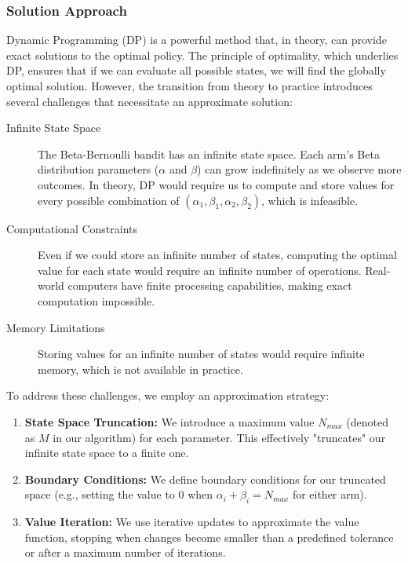 \documentclass[11pt]{article}
\begin{document}
\subsubsection*{Solution Approach}

Dynamic Programming (DP) is a powerful method that, in theory, can provide exact solutions to the optimal policy. The principle of optimality, which underlies DP, ensures that if we can evaluate all possible states, we will find the globally optimal solution. However, the transition from theory to practice introduces several challenges that necessitate an approximate solution:

\begin{description}
    \item[Infinite State Space] The Beta-Bernoulli bandit has an infinite state space. Each arm's Beta distribution parameters ($\alpha$ and $\beta$) can grow indefinitely as we observe more outcomes. In theory, DP would require us to compute and store values for every possible combination of $(\alpha_1, \beta_1, \alpha_2, \beta_2)$, which is infeasible.

    \item[Computational Constraints] Even if we could store an infinite number of states, computing the optimal value for each state would require an infinite number of operations. Real-world computers have finite processing capabilities, making exact computation impossible.

    \item[Memory Limitations] Storing values for an infinite number of states would require infinite memory, which is not available in practice.
\end{description}

To address these challenges, we employ an approximation strategy:

\begin{enumerate}
    \item \textbf{State Space Truncation:} We introduce a maximum value $N_{max}$ (denoted as $M$ in our algorithm) for each parameter. This effectively "truncates" our infinite state space to a finite one.

    \item \textbf{Boundary Conditions:} We define boundary conditions for our truncated space (e.g., setting the value to 0 when $\alpha_i + \beta_i = N_{max}$ for either arm).

    \item \textbf{Value Iteration:} We use iterative updates to approximate the value function, stopping when changes become smaller than a predefined tolerance or after a maximum number of iterations.
\end{enumerate}
\end{document}
